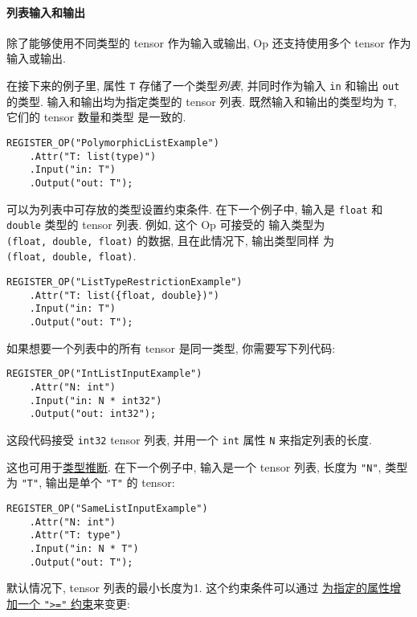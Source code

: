 \paragraph{列表输入和输出
}\label{ux5217ux8868ux8f93ux5165ux548cux8f93ux51fa}

除了能够使用不同类型的 tensor 作为输入或输出, Op 还支持使用多个 tensor
作为输入或输出.

在接下来的例子里, 属性 \texttt{T} 存储了一个类型\emph{列表},
并同时作为输入 \texttt{in} 和输出 \texttt{out} 的类型.
输入和输出均为指定类型的 tensor 列表. 既然输入和输出的类型均为
\texttt{T}, 它们的 tensor 数量和类型 是一致的.

\begin{verbatim}
REGISTER_OP("PolymorphicListExample")
    .Attr("T: list(type)")
    .Input("in: T")
    .Output("out: T");
\end{verbatim}

可以为列表中可存放的类型设置约束条件. 在下一个例子中, 输入是
\texttt{float} 和 \texttt{double} 类型的 tensor 列表. 例如, 这个 Op
可接受的 输入类型为 \texttt{(float,\ double,\ float)} 的数据,
且在此情况下, 输出类型同样 为 \texttt{(float,\ double,\ float)}.

\begin{verbatim}
REGISTER_OP("ListTypeRestrictionExample")
    .Attr("T: list({float, double})")
    .Input("in: T")
    .Output("out: T");
\end{verbatim}

如果想要一个列表中的所有 tensor 是同一类型, 你需要写下列代码:

\begin{verbatim}
REGISTER_OP("IntListInputExample")
    .Attr("N: int")
    .Input("in: N * int32")
    .Output("out: int32");
\end{verbatim}

这段代码接受 \texttt{int32} tensor 列表, 并用一个 \texttt{int} 属性
\texttt{N} 来指定列表的长度.

这也可用于\protect\hyperlink{type-polymorphism}{类型推断}.
在下一个例子中, 输入是一个 tensor 列表, 长度为 \texttt{"N"}, 类型为
\texttt{"T"}, 输出是单个 \texttt{"T"} 的 tensor:

\begin{verbatim}
REGISTER_OP("SameListInputExample")
    .Attr("N: int")
    .Attr("T: type")
    .Input("in: N * T")
    .Output("out: T");
\end{verbatim}

默认情况下, tensor 列表的最小长度为1. 这个约束条件可以通过
\protect\hyperlink{default-values-constraints}{为指定的属性增加一个
\texttt{"\textgreater{}="} 约束}来变更:

